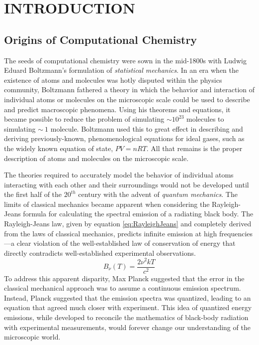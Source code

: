 \chapter{INTRODUCTION}

\section{Origins of Computational Chemistry}
The seeds of computational chemistry were sown in the mid-1800s with Ludwig
Eduard Boltzmann's formulation of \textit{statistical mechanics}. In an era when
the existence of atoms and molecules was hotly disputed within the physics
community, Boltzmann fathered a theory in which the behavior and interaction of
individual atoms or molecules on the microscopic scale could be used to
describe and predict macroscopic phenomena. Using his theorems and equations,
it became possible to reduce the problem of simulating $\sim 10^{23}$ molecules
to simulating $\sim ~1$ molecule. Boltzmann used this to great effect in
describing and deriving previously-known, phenomenological equations for ideal
gases, such as the widely known equation of state, $P V = n R T$. All that
remains is the proper description of atoms and molecules on the microscopic
scale.

The theories required to accurately model the behavior of individual atoms
interacting with each other and their surroundings would not be developed until
the first half of the $20^{th}$ century with the advent of \textit{quantum
mechanics}. The limits of classical mechanics became apparent when considering
the Rayleigh-Jeans formula for calculating the spectral emission of a radiating
black body. The Rayleigh-Jeans law, given by equation \ref{eq:RayleighJeans} and
completely derived from the laws of classical mechanics, predicts infinite
emission at high frequencies---a clear violation of the well-established law of
conservation of energy that directly contradicts well-established experimental
observations.
\begin{equation}
   B_{\nu} (T)  = \frac{2 \nu^2 k T} {c^2}
   \label{eq:RayleighJeans}
\end{equation}
To address this apparent disparity, Max Planck suggested that the error in the
classical mechanical approach was to assume a continuous emission spectrum.
Instead, Planck suggested that the emission spectra was quantized, leading to an
equation that agreed much closer with experiment. This idea of quantized energy
emissions, while developed to reconcile the mathematics of black-body radiation
with experimental measurements, would forever change our understanding of the
microscopic world.

